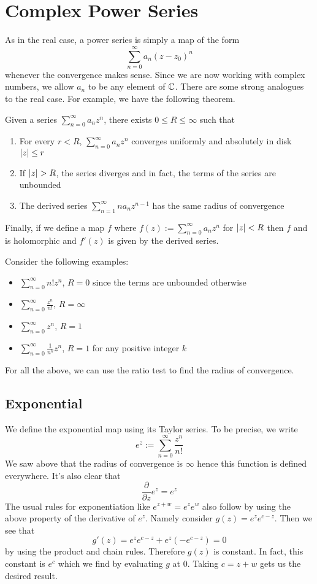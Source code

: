 \section{Complex Power Series}
As in the real case, a power series is simply a map of the form
$$ \sum_{n = 0}^{\infty} a_n (z - z_0)^n $$
whenever the convergence makes sense. Since we are now working with complex numbers, we allow $a_n$ to be any element of $\mathbb{C}$. There are some strong analogues to the real case. For example, we have the following theorem.
\begin{theorem}\label{thm:radius-of-conv}
Given a series $\displaystyle \sum_{n = 0}^\infty a_n z^n$, there exists $0\leq R \leq \infty$ such that
\begin{enumerate}
    \item For every $r < R$, $\sum_{n = 0}^{\infty} a_n z^n$ converges uniformly and absolutely in disk $\left|z\right| \leq r$
    \item If $\left|z\right| > R$, the series diverges and in fact, the terms of the series are unbounded
    \item The derived series $\sum_{n = 1}^{\infty} n a_n z^{n - 1}$ has the same radius of convergence
\end{enumerate}
Finally, if we define a map $f$ where $f(z) := \sum_{n = 0}^\infty a_n z^n$ for $\left|z\right| < R$ then $f$ and is holomorphic and $f'(z)$ is given by the derived series.
\end{theorem}
Consider the following examples:
\begin{itemize}
    \item $\displaystyle\sum_{n = 0}^{\infty} n! z^n$, $R = 0$ since the terms are unbounded otherwise
    \item $\displaystyle \sum_{n = 0}^\infty \frac{z^n}{n!}$, $R = \infty$
    \item $\displaystyle \sum_{n = 0}^{\infty} z^n$, $R = 1$
    \item $\displaystyle \sum_{n = 0}^\infty \frac{1}{n^k} z^n$, $R = 1$ for any positive integer $k$
\end{itemize}
For all the above, we can use the ratio test to find the radius of convergence.

\subsection{Exponential}
We define the exponential map using its Taylor series. To be precise, we write
$$ e^z := \sum_{n = 0}^\infty \frac{z^n}{n!} $$
We saw above that the radius of convergence is $\infty$ hence this function is defined everywhere. It's also clear that 
$$ \frac{\partial}{\partial z} e^z = e^z$$
The usual rules for exponentiation like $e^{z + w} = e^z e^w$ also follow by using the above property of the derivative of $e^z$. Namely consider $g(z) = e^z e^{c - z}$. Then we see that
$$ g'(z) = e^z e^{c - z} + e^z (-e^{c - z}) = 0 $$
by using the product and chain rules. Therefore $g(z)$ is constant. In fact, this constant is $e^c$ which we find by evaluating $g$ at 0. Taking $c = z + w$ gets us the desired result.

